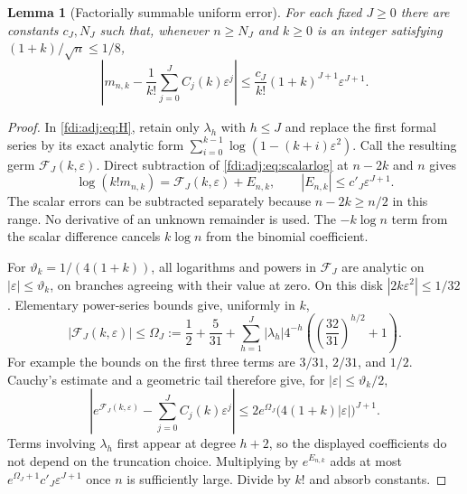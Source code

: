 \documentclass[11pt,letterpaper]{article}
\newtheorem{lemma}[theorem]{Lemma}
\theoremstyle{remark}\newtheorem{remark}[theorem]{Remark}
\newcommand{\eps}{\varepsilon}\newcommand{\Pois}{\operatorname{Poisson}}
\begin{document}
\begin{lemma}[Factorially summable uniform error]\label{fdi:adj:lem:uniform}
For each fixed $J\ge0$ there are constants $c_J,N_J$ such that, whenever $n\ge N_J$ and $k\ge0$ is an integer satisfying $(1+k)/\sqrt n\le1/8$,
\begin{equation}\label{fdi:adj:eq:momenterror}
 \left|m_{n,k}-\frac1{k!}\sum_{j=0}^JC_j(k)\eps^j\right|
 \le\frac{c_J}{k!}(1+k)^{J+1}\eps^{J+1}.
\end{equation}
\end{lemma}
\begin{proof}
In \eqref{fdi:adj:eq:H}, retain only $\lambda_h$ with $h\le J$ and replace the first formal series by its exact analytic form
$\sum_{i=0}^{k-1}\log(1-(k+i)\eps^2)$. Call the resulting germ $\mathcal F_J(k,\eps)$. Direct subtraction of \eqref{fdi:adj:eq:scalarlog} at $n-2k$ and $n$ gives
\[
 \log(k!m_{n,k})=\mathcal F_J(k,\eps)+E_{n,k},\qquad |E_{n,k}|\le c'_J\eps^{J+1}.
\]
The scalar errors can be subtracted separately because $n-2k\ge n/2$ in this range. No derivative of an unknown remainder is used. The $-k\log n$ term from the scalar difference cancels $k\log n$ from the binomial coefficient.

For $\vartheta_k=1/(4(1+k))$, all logarithms and powers in $\mathcal F_J$ are analytic on $|\eps|\le\vartheta_k$, on branches agreeing with their value at zero. On this disk $|2k\eps^2|\le1/32$. Elementary power-series bounds give, uniformly in $k$,
\[
 |\mathcal F_J(k,\eps)|\le \Omega_J:=\frac12+\frac5{31}
 +\sum_{h=1}^J|\lambda_h|4^{-h}
          \left(\left(\frac{32}{31}\right)^{h/2}+1\right).
\]
For example the bounds on the first three terms are $3/31$, $2/31$, and $1/2$. Cauchy's estimate and a geometric tail therefore give, for $|\eps|\le\vartheta_k/2$,
\[
 \left|e^{\mathcal F_J(k,\eps)}-\sum_{j=0}^JC_j(k)\eps^j\right|
 \le2e^{\Omega_J}\bigl(4(1+k)|\eps|\bigr)^{J+1}.
\]
Terms involving $\lambda_h$ first appear at degree $h+2$, so the displayed coefficients do not depend on the truncation choice. Multiplying by $e^{E_{n,k}}$ adds at most $e^{\Omega_J+1}c'_J\eps^{J+1}$ once $n$ is sufficiently large. Divide by $k!$ and absorb constants.
\end{proof}
\end{document}
